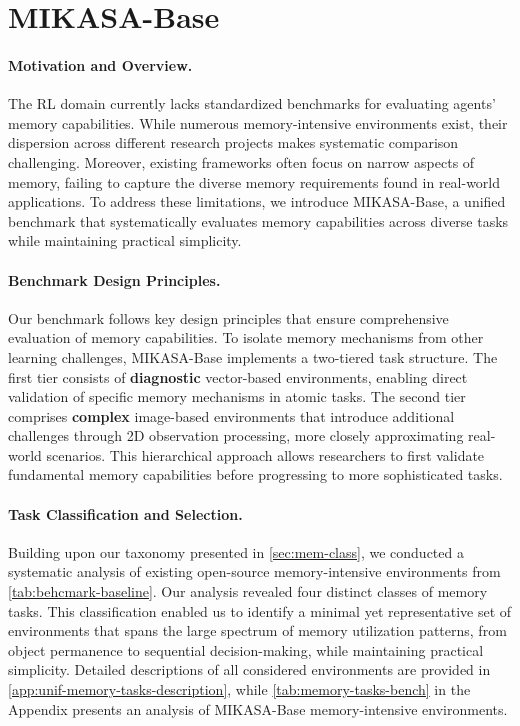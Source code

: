 \newpage
\section{MIKASA-Base}
\label{sec:rl-memory-benchmark}

\paragraph{Motivation and Overview.}
The RL domain currently lacks standardized benchmarks for evaluating agents' memory capabilities. While numerous memory-intensive environments exist, their dispersion across different research projects makes systematic comparison challenging. Moreover, existing frameworks often focus on narrow aspects of memory, failing to capture the diverse memory requirements found in real-world applications. To address these limitations, we introduce MIKASA-Base, a unified benchmark that systematically evaluates memory capabilities across diverse tasks while maintaining practical simplicity.

\textbf{}

\paragraph{Benchmark Design Principles.}
Our benchmark follows key design principles that ensure comprehensive evaluation of memory capabilities. To isolate memory mechanisms from other learning challenges, MIKASA-Base implements a two-tiered task structure. The first tier consists of \textbf{diagnostic} vector-based environments, enabling direct validation of specific memory mechanisms in atomic tasks. The second tier comprises \textbf{complex} image-based environments that introduce additional challenges through 2D observation processing, more closely approximating real-world scenarios. This hierarchical approach allows researchers to first validate fundamental memory capabilities before progressing to more sophisticated tasks.

\paragraph{Task Classification and Selection.}
Building upon our taxonomy presented in \autoref{sec:mem-class}, we conducted a systematic analysis of existing open-source memory-intensive environments from \autoref{tab:behcmark-baseline}. Our analysis revealed four distinct classes of memory tasks. This classification enabled us to identify a minimal yet representative set of environments that spans the large spectrum of memory utilization patterns, from object permanence to sequential decision-making, while maintaining practical simplicity. Detailed descriptions of all considered environments are provided in \autoref{app:unif-memory-tasks-description}, while \autoref{tab:memory-tasks-bench} in the Appendix presents an analysis of MIKASA-Base memory-intensive environments.

